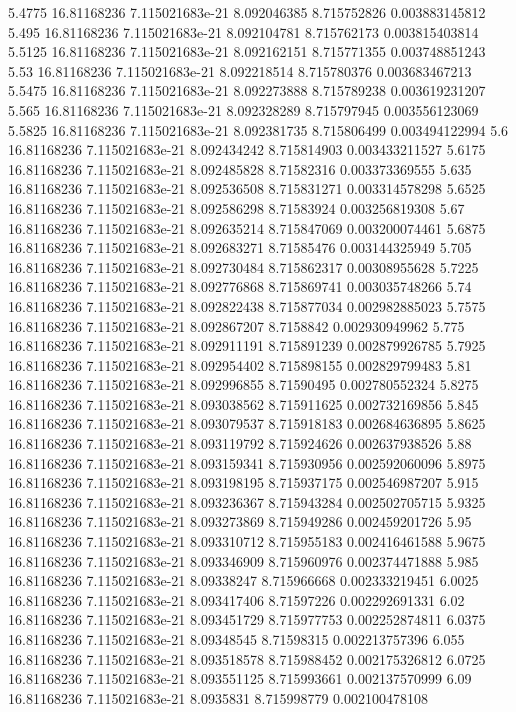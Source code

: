 {5.4775 16.81168236 7.115021683e-21 8.092046385 8.715752826 0.003883145812
5.495 16.81168236 7.115021683e-21 8.092104781 8.715762173 0.003815403814
5.5125 16.81168236 7.115021683e-21 8.092162151 8.715771355 0.003748851243
5.53 16.81168236 7.115021683e-21 8.092218514 8.715780376 0.003683467213
5.5475 16.81168236 7.115021683e-21 8.092273888 8.715789238 0.003619231207
5.565 16.81168236 7.115021683e-21 8.092328289 8.715797945 0.003556123069
5.5825 16.81168236 7.115021683e-21 8.092381735 8.715806499 0.003494122994
5.6 16.81168236 7.115021683e-21 8.092434242 8.715814903 0.003433211527
5.6175 16.81168236 7.115021683e-21 8.092485828 8.71582316 0.003373369555
5.635 16.81168236 7.115021683e-21 8.092536508 8.715831271 0.003314578298
5.6525 16.81168236 7.115021683e-21 8.092586298 8.71583924 0.003256819308
5.67 16.81168236 7.115021683e-21 8.092635214 8.715847069 0.003200074461
5.6875 16.81168236 7.115021683e-21 8.092683271 8.71585476 0.003144325949
5.705 16.81168236 7.115021683e-21 8.092730484 8.715862317 0.00308955628
5.7225 16.81168236 7.115021683e-21 8.092776868 8.715869741 0.003035748266
5.74 16.81168236 7.115021683e-21 8.092822438 8.715877034 0.002982885023
5.7575 16.81168236 7.115021683e-21 8.092867207 8.7158842 0.002930949962
5.775 16.81168236 7.115021683e-21 8.092911191 8.715891239 0.002879926785
5.7925 16.81168236 7.115021683e-21 8.092954402 8.715898155 0.002829799483
5.81 16.81168236 7.115021683e-21 8.092996855 8.71590495 0.002780552324
5.8275 16.81168236 7.115021683e-21 8.093038562 8.715911625 0.002732169856
5.845 16.81168236 7.115021683e-21 8.093079537 8.715918183 0.002684636895
5.8625 16.81168236 7.115021683e-21 8.093119792 8.715924626 0.002637938526
5.88 16.81168236 7.115021683e-21 8.093159341 8.715930956 0.002592060096
5.8975 16.81168236 7.115021683e-21 8.093198195 8.715937175 0.002546987207
5.915 16.81168236 7.115021683e-21 8.093236367 8.715943284 0.002502705715
5.9325 16.81168236 7.115021683e-21 8.093273869 8.715949286 0.002459201726
5.95 16.81168236 7.115021683e-21 8.093310712 8.715955183 0.002416461588
5.9675 16.81168236 7.115021683e-21 8.093346909 8.715960976 0.002374471888
5.985 16.81168236 7.115021683e-21 8.09338247 8.715966668 0.002333219451
6.0025 16.81168236 7.115021683e-21 8.093417406 8.71597226 0.002292691331
6.02 16.81168236 7.115021683e-21 8.093451729 8.715977753 0.002252874811
6.0375 16.81168236 7.115021683e-21 8.09348545 8.71598315 0.002213757396
6.055 16.81168236 7.115021683e-21 8.093518578 8.715988452 0.002175326812
6.0725 16.81168236 7.115021683e-21 8.093551125 8.715993661 0.002137570999
6.09 16.81168236 7.115021683e-21 8.0935831 8.715998779 0.002100478108
}
